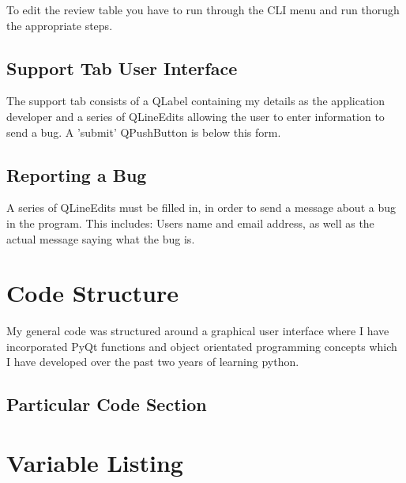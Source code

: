 To edit the review table you have to run through the CLI menu and run thorugh the appropriate steps.



\subsection{Support Tab User Interface}

The support tab consists of a QLabel containing my details as the application developer and a series of QLineEdits allowing the user to enter information to send a bug. A 'submit' QPushButton is below this form.

\subsection{Reporting a Bug}

A series of QLineEdits must be filled in, in order to send a message about a bug in the program. This includes: Users name and email address, as well as the actual message saying what the bug is. 







\section{Code Structure}

My general code was structured around a graphical user interface where I have incorporated PyQt functions and object orientated programming concepts which I have developed over the past two years of learning python. 

\subsection{Particular Code Section}

\section{Variable Listing}

